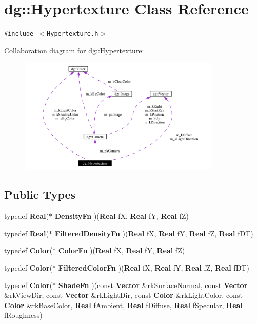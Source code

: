 \section{dg::Hypertexture Class Reference}
\label{classdg_1_1Hypertexture}
{\tt \#include $<$Hypertexture.h$>$}

Collaboration diagram for dg::Hypertexture:\begin{figure}[H]
\begin{center}
\leavevmode
\includegraphics[width=274pt]{classdg_1_1Hypertexture__coll__graph}
\end{center}
\end{figure}
\subsection*{Public Types}
\begin{CompactItemize}
\item 
typedef {\bf Real}($\ast$ {\bf Density\-Fn} )({\bf Real} f\-X, {\bf Real} f\-Y, {\bf Real} f\-Z)
\item 
typedef {\bf Real}($\ast$ {\bf Filtered\-Density\-Fn} )({\bf Real} f\-X, {\bf Real} f\-Y, {\bf Real} f\-Z, {\bf Real} f\-DT)
\item 
typedef {\bf Color}($\ast$ {\bf Color\-Fn} )({\bf Real} f\-X, {\bf Real} f\-Y, {\bf Real} f\-Z)
\item 
typedef {\bf Color}($\ast$ {\bf Filtered\-Color\-Fn} )({\bf Real} f\-X, {\bf Real} f\-Y, {\bf Real} f\-Z, {\bf Real} f\-DT)
\item 
typedef {\bf Color}($\ast$ {\bf Shade\-Fn} )(const {\bf Vector} \&rk\-Surface\-Normal, const {\bf Vector} \&rk\-View\-Dir, const {\bf Vector} \&rk\-Light\-Dir, const {\bf Color} \&rk\-Light\-Color, const {\bf Color} \&rk\-Base\-Color, {\bf Real} f\-Ambient, {\bf Real} f\-Diffuse, {\bf Real} f\-Specular, {\bf Real} f\-Roughness)
\end{CompactItemize}
